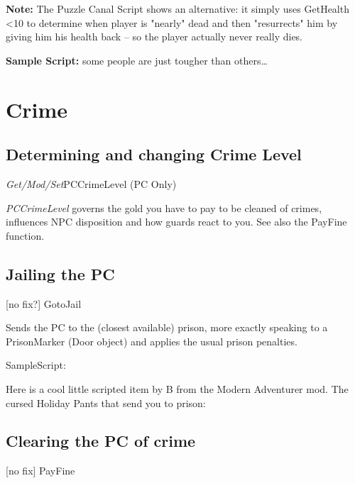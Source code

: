 \textbf{Note:} The Puzzle Canal Script shows an alternative: it simply
uses GetHealth <10 to determine when player is "nearly" dead and
then "resurrects" him by giving him his health back -- so the player
actually never really dies.

\textbf{Sample Script:} some people are just tougher than others\ldots{}



\hypertarget{crime}{%
\section{\texorpdfstring{\hfill\break
Crime}{ Crime}}\label{crime}}

\hypertarget{determining-and-changing-crime-level}{%
\subsection{Determining and changing Crime
Level}\label{determining-and-changing-crime-level}}

\emph{Get/Mod/Set}PCCrimeLevel (PC Only)

\emph{PCCrimeLevel} governs the gold you have to pay to be cleaned of
crimes, influences NPC disposition and how guards react to you. See also
the PayFine function.

\hypertarget{jailing-the-pc}{%
\subsection{Jailing the PC}\label{jailing-the-pc}}

{[}no fix?{]} GotoJail

Sends the PC to the (closest available) prison, more exactly speaking to
a PrisonMarker (Door object) and applies the usual prison penalties.

SampleScript:

Here is a cool little scripted item by B from the Modern Adventurer mod.
The cursed Holiday Pants that send you to prison:



\hypertarget{clearing-the-pc-of-crime}{%
\subsection{Clearing the PC of crime}\label{clearing-the-pc-of-crime}}

{[}no fix{]} PayFine

